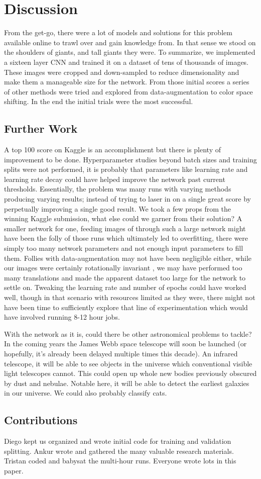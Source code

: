 \section{Discussion}

From the get-go, there were a lot of models and solutions for this problem available online to trawl over and gain knowledge from. In that sense we stood on the shoulders of giants, and tall giants they were. To summarize, we implemented a sixteen layer CNN and trained it on a dataset of tens of thousands of images. These images were cropped and down-sampled to reduce dimensionality and make them a manageable size for the network. From those initial scores a series of other methods were tried and explored from data-augmentation to color space shifting. In the end the initial trials were the most successful. 

\subsection{Further Work}
A top 100 score on Kaggle is an accomplishment but there is plenty of improvement to be done. Hyperparameter studies beyond batch sizes and training splits were not performed, it is probably that parameters like learning rate and learning rate decay could have helped improve the network past current thresholds. Essentially, the problem was many runs with varying methods producing varying results; instead of trying to laser in on a single great score by perpetually improving a single good result. We took a few props from the winning Kaggle submission, what else could we garner from their solution? A smaller network for one, feeding images of  through such a large network might have been the folly of those runs which ultimately led to overfitting, there were simply too many network parameters and not enough input parameters to fill them. Follies with data-augmentation may not have been negligible either, while our images were certainly rotationally invariant , we may have performed too many translations and made the apparent dataset too large for the network to settle on. Tweaking the learning rate and number of epochs could have worked well, though in that scenario with resources limited as they were, there might not have been time to sufficiently explore that line of experimentation which would have involved running 8-12 hour jobs.

With the network as it is, could there be other astronomical problems to tackle? In the coming years the James Webb space telescope will soon be launched (or hopefully, it's already been delayed multiple times this decade). An infrared telescope, it will be able to see objects in the universe which conventional visible light telescopes cannot. This could open up whole new bodies previously obscured by dust and nebulae. Notable here, it will be able to detect the earliest galaxies in our universe. We could also probably classify cats.

\subsection{Contributions}
Diego kept us organized and wrote initial code for training and validation splitting. Ankur wrote and gathered the many valuable research materials.
Tristan coded and babysat the multi-hour runs. Everyone wrote lots in this paper.